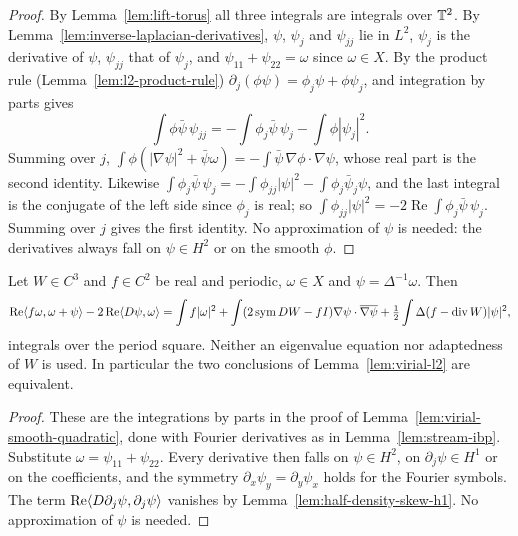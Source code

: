 \begin{proof}
\leanok
By Lemma~\ref{lem:lift-torus} all three integrals are integrals over $\mathbb{T}^2$. By
Lemma~\ref{lem:inverse-laplacian-derivatives}, $\psi$, $\psi_j$ and $\psi_{jj}$ lie in $L^2$,
$\psi_j$ is the derivative of $\psi$, $\psi_{jj}$ that of $\psi_j$, and
$\psi_{11}+\psi_{22}=\omega$ since $\omega\in X$. By the product rule
(Lemma~\ref{lem:l2-product-rule}) $\partial_j(\phi\psi)=\phi_j\psi+\phi\psi_j$, and
integration by parts gives
\[
  \int\phi\bar\psi\,\psi_{jj}=-\int\phi_j\bar\psi\,\psi_j-\int\phi|\psi_j|^2 .
\]
Summing over $j$, $\int\phi(|\nabla\psi|^2+\bar\psi\omega)=-\int\bar\psi\,\nabla\phi\cdot\nabla\psi$,
whose real part is the second identity. Likewise
$\int\phi_j\bar\psi\,\psi_j=-\int\phi_{jj}|\psi|^2-\int\phi_j\bar\psi_j\psi$, and the last
integral is the conjugate of the left side since $\phi_j$ is real; so
$\int\phi_{jj}|\psi|^2=-2\operatorname{Re}\int\phi_j\bar\psi\,\psi_j$. Summing over $j$ gives
the first identity. No approximation of $\psi$ is needed: the derivatives always fall on
$\psi\in H^2$ or on the smooth $\phi$.
\end{proof}

\begin{lemma}
\label{lem:virial-forms}
\leanok
Let $W\in C^3$ and $f\in C^2$ be real and periodic, $\omega\in X$ and
$\psi=\Delta^{-1}\omega$. Then
\[
  \operatorname{Re}\langle f\omega,\omega+\psi\rangle-2\operatorname{Re}\langle D\psi,\omega\rangle
  =\int f|\omega|^2+\int(2\operatorname{sym} DW-fI)\nabla\psi\cdot\overline{\nabla\psi}
    +\tfrac12\int\Delta(f-\operatorname{div} W)|\psi|^2 ,
\]
integrals over the period square. Neither an eigenvalue equation nor adaptedness of $W$
is used. In particular the two conclusions of Lemma~\ref{lem:virial-l2} are equivalent.
\end{lemma}

\begin{proof}
\leanok
These are the integrations by parts in the proof of
Lemma~\ref{lem:virial-smooth-quadratic}, done with Fourier derivatives as in
Lemma~\ref{lem:stream-ibp}. Substitute $\omega=\psi_{11}+\psi_{22}$. Every derivative then
falls on $\psi\in H^2$, on $\partial_j\psi\in H^1$ or on the coefficients, and the symmetry
$\partial_x\psi_y=\partial_y\psi_x$ holds for the Fourier symbols. The term
$\operatorname{Re}\langle D\partial_j\psi,\partial_j\psi\rangle$ vanishes by
Lemma~\ref{lem:half-density-skew-h1}. No approximation of $\psi$ is needed.
\end{proof}

